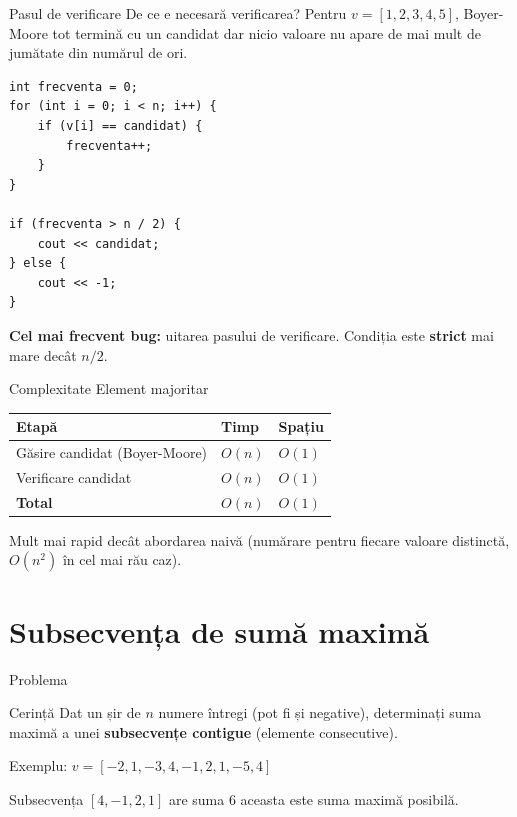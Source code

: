 \documentclass{beamer}
\begin{document}
\begin{frame}{Pasul de verificare}
  De ce e necesară verificarea? Pentru $v = [1, 2, 3, 4, 5]$, Boyer-Moore tot termină cu un candidat \textemdash{} dar nicio valoare nu apare de mai mult de jumătate din numărul de ori.
  \begin{lstlisting}
int frecventa = 0;
for (int i = 0; i < n; i++) {
    if (v[i] == candidat) {
        frecventa++;
    }
}

if (frecventa > n / 2) {
    cout << candidat;
} else {
    cout << -1;
}
  \end{lstlisting}
  \textbf{Cel mai frecvent bug:} uitarea pasului de verificare. Condiția este \textbf{strict} mai mare decât $n/2$.
\end{frame}

\begin{frame}{Complexitate \textemdash{} Element majoritar}
  \begin{center}
  \begin{tabular}{lll}
    \toprule
    Etapă & Timp & Spațiu \\
    \midrule
    Găsire candidat (Boyer-Moore) & $O(n)$ & $O(1)$ \\
    Verificare candidat           & $O(n)$ & $O(1)$ \\
    \midrule
    \textbf{Total}                & $O(n)$ & $O(1)$ \\
    \bottomrule
  \end{tabular}
  \end{center}

  \smallskip
  Mult mai rapid decât abordarea naivă (numărare pentru fiecare valoare distinctă, $O(n^2)$ în cel mai rău caz).
\end{frame}

\section{Subsecvența de sumă maximă}

\begin{frame}{Problema}
  \begin{block}{Cerință}
    Dat un șir de $n$ numere întregi (pot fi și negative), determinați suma maximă a unei \textbf{subsecvențe contigue} (elemente consecutive).
  \end{block}

  \smallskip
  Exemplu: $v = [-2, 1, -3, 4, -1, 2, 1, -5, 4]$

  \smallskip
  Subsecvența $[4, -1, 2, 1]$ are suma $6$ \textemdash{} aceasta este suma maximă posibilă.
\end{frame}
\end{document}
